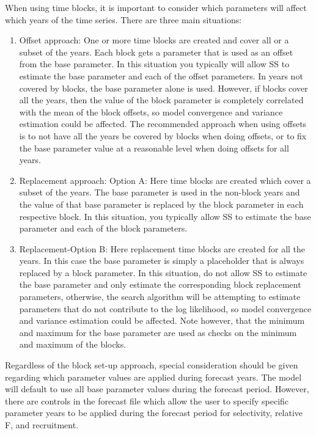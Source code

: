 When using time blocks, it is important to consider which parameters will affect which years of the time series.  There are three main situations:
\begin{enumerate}
	\item Offset approach: One or more time blocks are created and cover all or a subset of the years.  Each block gets a parameter that is used as an offset from the base parameter.  In this situation you typically will allow SS to estimate the base parameter and each of the offset parameters.  In years not covered by blocks, the base parameter alone is used.  However, if blocks cover all the years, then the value of the block parameter is completely correlated with the mean of the block offsets, so model convergence and variance estimation could be affected.  The recommended approach when using offsets is to not have all the years be covered by blocks when doing offsets, or to fix the base parameter value at a reasonable level when doing offsets for all years.	
	\item Replacement approach: Option A: Here time blocks are created which cover a subset of the years.  The base parameter is used in the non-block years and the value of that base parameter is replaced by the block parameter in each respective block.  In this situation, you typically allow SS to estimate the base parameter and each of the block parameters.	
	\item Replacement-Option B: Here replacement time blocks are created for all the years.  In this case the base parameter is simply a placeholder that is always replaced by a block parameter.   In this situation, do not allow SS to estimate the base parameter and only estimate the corresponding block replacement parameters, otherwise, the search algorithm will be attempting to estimate parameters that do not contribute to the log likelihood, so model convergence and variance estimation could be affected.  Note however, that the minimum and maximum for the base parameter are used as checks on the minimum and maximum of the blocks.
\end{enumerate}

Regardless of the block set-up approach, special consideration should be given regarding which parameter values are applied during forecast years. The model will default to use all base parameter values during the forecast period. However, there are controls in the forecast file which allow the user to specify specific parameter years to be applied during the forecast period for selectivity, relative F, and recruitment.  

